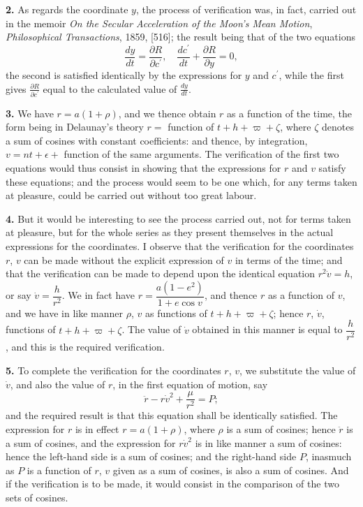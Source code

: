 \documentclass[11pt,a4paper]{book}
\begin{document}
{{{\newpage
\textbf{2.} As regards the coordinate $y$, the process of verification was, in fact,
carried out in the memoir \textit{On the Secular Acceleration of the Moon's Mean Motion},
\textit{Philosophical Transactions}, 1859, [516]; the result being that of the two equations
\[
\frac{dy}{dt} = \frac{\partial R}{\partial c^\prime}, \quad \frac{dc^\prime}{dt} + \frac{\partial R}{\partial y} = 0,
\]
the second is satisfied identically by the expressions for $y$ and $c^\prime$, while the first gives
$\frac{\partial R}{\partial c^\prime}$ equal to the calculated value of $\frac{dy}{dt}$.

\textbf{3.} We have $r = a(1 + \rho)$, and we thence obtain $r$ as a function of the time, the
form being in Delaunay's theory $r =$ function of $t + h + \varpi + \zeta$, where $\zeta$ denotes a sum of
cosines with constant coefficients: and thence, by integration, $v = n t + \epsilon +$ function
of the same arguments. The verification of the first two equations would thus
consist in showing that the expressions for $r$ and $v$ satisfy these equations; and the
process would seem to be one which, for any terms taken at pleasure, could be
carried out without too great labour.

\textbf{4.} But it would be interesting to see the process carried out, not for terms
taken at pleasure, but for the whole series as they present themselves in the actual
expressions for the coordinates. I observe that the verification for the coordinates
$r$, $v$ can be made without the explicit expression of $v$ in terms of the time; and that
the verification can be made to depend upon the identical equation $r^2\dot{v} = h$, or say
$\dot{v} = \dfrac{h}{r^2}$. We in fact have $r = \dfrac{a(1-e^2)}{1+e\cos v}$, and thence $r$ as a function of $v$, and we
have in like manner $\rho$, $v$ as functions of $t + h + \varpi + \zeta$; hence $r$, $\dot{v}$, functions of
$t + h + \varpi + \zeta$. The value of $\dot{v}$ obtained in this manner is equal to $\dfrac{h}{r^2}$, and this is
the required verification.

\newpage
\textbf{5.} To complete the verification for the coordinates $r$, $v$, we substitute the
value of $\dot{v}$, and also the value of $r$, in the first equation of motion, say
\[
\ddot{r} - r\dot{v}^2 + \frac{\mu}{r^2} = P;
\]
and the required result is that this equation shall be identically satisfied. The
expression for $r$ is in effect $r = a(1 + \rho)$, where $\rho$ is a sum of cosines; hence $\ddot{r}$ is a sum
of cosines, and the expression for $r\dot{v}^2$ is in like manner a sum of cosines: hence the
left-hand side is a sum of cosines; and the right-hand side $P$, inasmuch as $P$ is a
function of $r$, $v$ given as a sum of cosines, is also a sum of cosines. And if the
verification is to be made, it would consist in the comparison of the two sets of
cosines.

}}}
\end{document}
